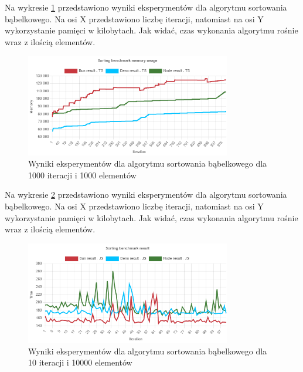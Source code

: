 Na wykresie \ref{fig:quick_sorting_e3_memory_ts} przedstawiono wyniki eksperymentów dla algorytmu sortowania bąbelkowego. Na osi X przedstawiono liczbę iteracji, natomiast na osi Y wykorzystanie pamięci w kilobytach. Jak widać, czas wykonania algorytmu rośnie wraz z ilością elementów.
\begin{figure}[H]
  \centering
  \includegraphics[width=0.8\textwidth]{Figures/sorting/quick/e3_memory_ts.png}
  \caption{Wyniki eksperymentów dla algorytmu sortowania bąbelkowego dla 1000 iteracji i 1000 elementów}
  \label{fig:quick_sorting_e3_memory_ts}
\end{figure}

Na wykresie \ref{fig:quick_sorting_e4} przedstawiono wyniki eksperymentów dla algorytmu sortowania bąbelkowego. Na osi X przedstawiono liczbę iteracji, natomiast na osi Y wykorzystanie pamięci w kilobytach. Jak widać, czas wykonania algorytmu rośnie wraz z ilością elementów.
\begin{figure}[H]
  \centering
  \includegraphics[width=0.8\textwidth]{Figures/sorting/quick/e4_js.png}
  \caption{Wyniki eksperymentów dla algorytmu sortowania bąbelkowego dla 10 iteracji i 10000 elementów}
  \label{fig:quick_sorting_e4}
\end{figure}

